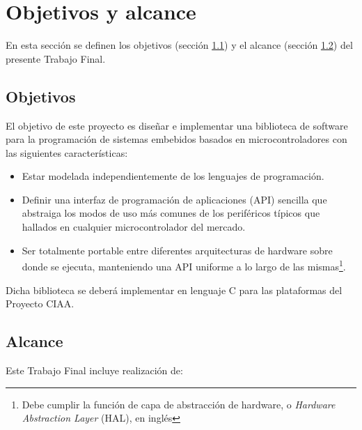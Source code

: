 \section{Objetivos y alcance}
\label{sec:objetivosAlance}

En esta sección se definen los objetivos (sección \ref{subsec:objetivos}) y el alcance (sección \ref{subsec:alcance}) del presente Trabajo Final.

\subsection{Objetivos}
\label{subsec:objetivos}

El objetivo de este proyecto es diseñar e implementar una biblioteca de
software para la programación de sistemas embebidos basados en
microcontroladores con las siguientes características: 

\begin{itemize}
   \item Estar modelada independientemente de los lenguajes de programación.
   \item Definir una interfaz de programación de aplicaciones (API) sencilla que abstraiga los modos de uso más comunes de los periféricos típicos que hallados en cualquier microcontrolador del mercado. 
   \item Ser totalmente portable entre diferentes arquitecturas de hardware sobre donde se ejecuta, manteniendo una API uniforme a lo largo de las mismas\footnote{Debe cumplir la función de capa de abstracción de hardware, o \textit{Hardware Abstraction Layer} (HAL),  en inglés}.
\end{itemize}

Dicha biblioteca se deberá implementar en lenguaje C para las plataformas del
Proyecto CIAA.

\subsection{Alcance}
\label{subsec:alcance}

Este Trabajo Final incluye realización de:

